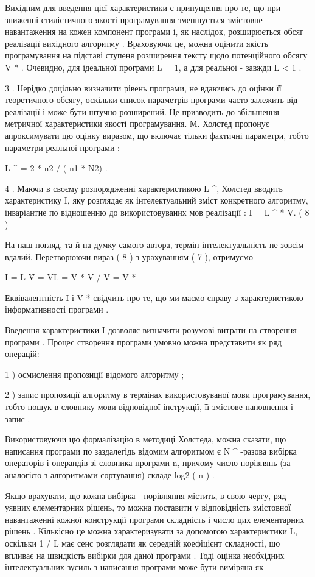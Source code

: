 \begin{description}
Вихідним для введення цієї характеристики є припущення про те, що при зниженні стилістичного якості програмування зменшується змістовне навантаження на кожен компонент програми і, як наслідок, розширюється обсяг реалізації вихідного алгоритму . Враховуючи це, можна оцінити якість програмування на підставі ступеня розширення тексту щодо потенційного обсягу V * . Очевидно, для ідеальної програми L = 1, а для реальної - завжди L \textless{} 1 .

3 . Нерідко доцільно визначити рівень програми, не вдаючись до оцінки її теоретичного обсягу, оскільки список параметрів програми часто залежить від реалізації і може бути штучно розширений. Це призводить до збільшення метричної характеристики якості програмування. М. Холстед пропонує апроксимувати цю оцінку виразом, що включає тільки фактичні параметри, тобто параметри реальної програми :

L \textasciicircum{} = 2 * n2 / ( n1 * N2) .

4 . Маючи в своєму розпорядженні характеристикою L \textasciicircum{}, Холстед вводить характеристику I, яку розглядає як інтелектуальний зміст конкретного алгоритму, інваріантне по відношенню до використовуваних мов реалізації : I = L \textasciicircum{} * V. ( 8 )

На наш погляд, та й на думку самого автора, термін інтелектуальність не зовсім вдалий. Перетворюючи вираз ( 8 ) з урахуванням ( 7 ), отримуємо

I = L \^ V = VL = V * V / V = V *

Еквівалентність I і V * свідчить про те, що ми маємо справу з характеристикою інформативності програми .

Введення характеристики I дозволяє визначити розумові витрати на створення програми . Процес створення програми умовно можна представити як ряд операцій:

1 ) осмислення пропозиції відомого алгоритму ;

2 ) запис пропозиції алгоритму в термінах використовуваної мови програмування, тобто пошук в словнику мови відповідної інструкції, її змістове наповнення і запис .

Використовуючи цю формалізацію в методиці Холстеда, можна сказати, що написання програми по заздалегідь відомим алгоритмом є N \textasciicircum{} -разова вибірка операторів і операндів зі словника програми n, причому число порівнянь (за аналогією з алгоритмами сортування) складе log2 ( n ) .

Якщо врахувати, що кожна вибірка - порівняння містить, в свою чергу, ряд уявних елементарних рішень, то можна поставити у відповідність змістовної навантаженні кожної конструкції програми складність і число цих елементарних рішень . Кількісно це можна характеризувати за допомогою характеристики L, оскільки 1 / L має сенс розглядати як середній коефіцієнт складності, що впливає на швидкість вибірки для даної програми . Тоді оцінка необхідних інтелектуальних зусиль з написання програми може бути виміряна як


\end{description}
